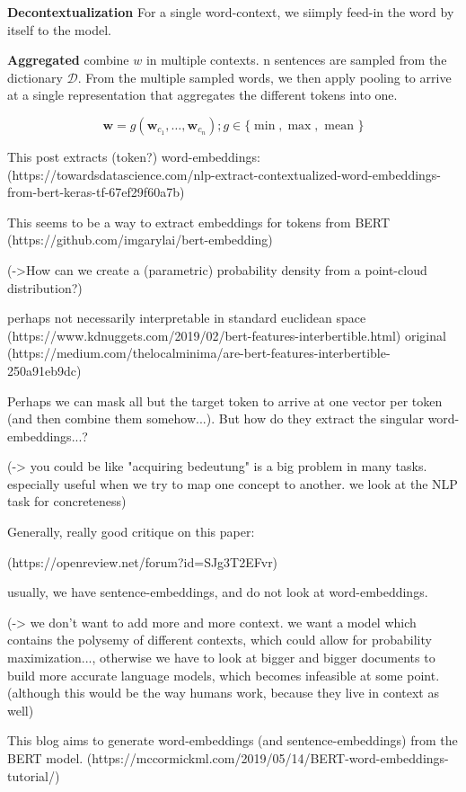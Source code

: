 \documentclass[a4paper,12pt,twoside,openright]{report}
\begin{document}
\textbf{Decontextualization} For a single word-context, we siimply feed-in the word by itself to the model.

\textbf{Aggregated} combine $w$ in multiple contexts.
n sentences are sampled from the dictionary $\mathcal{D}$.
From the multiple sampled words, we then apply pooling to arrive at a single representation that aggregates the different tokens into one.

$$
\mathbf{w}=g\left(\mathbf{w}_{c_{1}}, \dots, \mathbf{w}_{c_{n}}\right) ; g \in\{\min , \max , \text { mean }\}
$$


This post extracts (token?) word-embeddings: 
(https://towardsdatascience.com/nlp-extract-contextualized-word-embeddings-from-bert-keras-tf-67ef29f60a7b)

This seems to be a way to extract embeddings for tokens from BERT
(https://github.com/imgarylai/bert-embedding)

(->How can we create a (parametric) probability density from a point-cloud distribution?)

perhaps not necessarily interpretable in standard euclidean space
(https://www.kdnuggets.com/2019/02/bert-features-interbertible.html)
original (https://medium.com/thelocalminima/are-bert-features-interbertible-250a91eb9dc)

Perhaps we can mask all but the target token to arrive at one vector per token (and then combine them somehow...).
But how do they extract the singular word-embeddings...?

(-> you could be like "acquiring bedeutung" is a big problem in many tasks. especially useful when we try to map one concept to another. we look at the NLP task for concreteness)

Generally, really good critique on this paper:

(https://openreview.net/forum?id=SJg3T2EFvr)

usually, we have sentence-embeddings, and do not look at word-embeddings.

(-> we don't want to add more and more context. we want a model which contains the polysemy of different contexts, which could allow for probability maximization..., otherwise we have to look at bigger and bigger documents to build more accurate language models, which becomes infeasible at some point. (although this would be the way humans work, because they live in context as well)

This blog aims to generate word-embeddings (and sentence-embeddings) from the BERT model.
(https://mccormickml.com/2019/05/14/BERT-word-embeddings-tutorial/)
\end{document}
